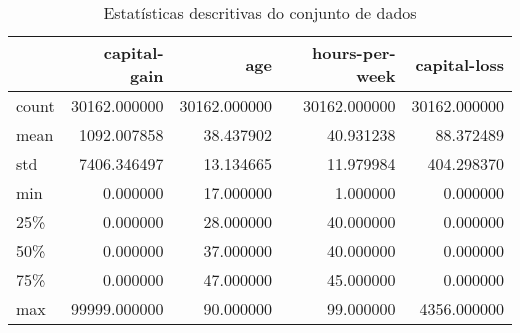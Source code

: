 \begin{table}
\centering
\caption{Estatísticas descritivas do conjunto de dados}
\label{tbl:descriptive_statistics}
\begin{tabular}{lrrrr}
\toprule
{} &  capital-gain &           age &  hours-per-week &  capital-loss \\
\midrule
count &  30162.000000 &  30162.000000 &    30162.000000 &  30162.000000 \\
mean  &   1092.007858 &     38.437902 &       40.931238 &     88.372489 \\
std   &   7406.346497 &     13.134665 &       11.979984 &    404.298370 \\
min   &      0.000000 &     17.000000 &        1.000000 &      0.000000 \\
25\%   &      0.000000 &     28.000000 &       40.000000 &      0.000000 \\
50\%   &      0.000000 &     37.000000 &       40.000000 &      0.000000 \\
75\%   &      0.000000 &     47.000000 &       45.000000 &      0.000000 \\
max   &  99999.000000 &     90.000000 &       99.000000 &   4356.000000 \\
\bottomrule
\end{tabular}
\end{table}
